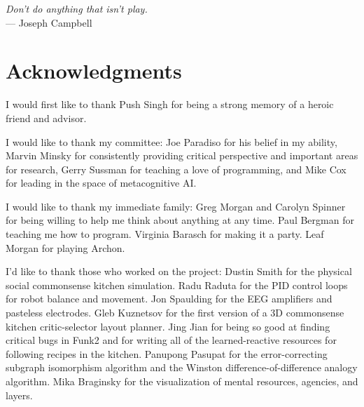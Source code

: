 



\begin{flushright}{\slshape    
Don't do anything that isn't play.} \\ \medskip
    --- Joseph Campbell
\end{flushright}



\bigskip

\begingroup
\let\clearpage\relax
\let\cleardoublepage\relax
\let\cleardoublepage\relax
\chapter*{Acknowledgments}

I would first like to thank Push Singh for being a strong memory of a
heroic friend and advisor.

\vspace{5mm}

\noindent I would like to thank my committee:
Joe Paradiso for his belief in my ability,
Marvin Minsky for consistently providing critical perspective and important areas for research,
Gerry Sussman for teaching a love of programming, and
Mike Cox for leading in the space of metacognitive AI.

\vspace{5mm}

\noindent I would like to thank my immediate family:
Greg Morgan and Carolyn Spinner for being willing to help me think about anything at any time.
Paul Bergman for teaching me how to program.
Virginia Barasch for making it a party.
Leaf Morgan for playing Archon.

\vspace{5mm}

\noindent I'd like to thank those who worked on the project:
Dustin Smith for the physical social commonsense kitchen simulation.
Radu Raduta for the PID control loops for robot balance and movement.
Jon Spaulding for the EEG amplifiers and pasteless electrodes.
Gleb Kuznetsov for the first version of a 3D commonsense kitchen critic-selector layout planner.
Jing Jian for being so good at finding critical bugs in Funk2 and for writing all of the learned-reactive resources for following recipes in the kitchen.
Panupong Pasupat for the error-correcting subgraph isomorphism algorithm and the Winston difference-of-difference analogy algorithm.
Mika Braginsky for the visualization of mental resources, agencies, and layers.

